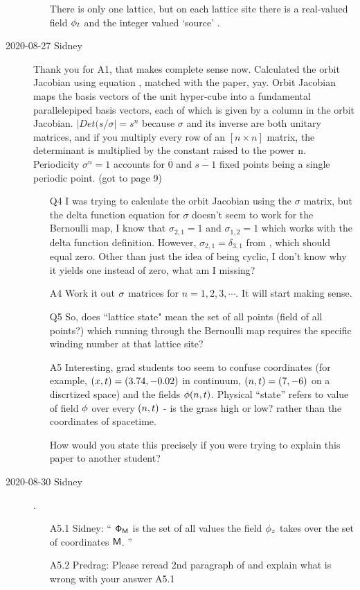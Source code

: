 \begin{description}
\begin{itemize}
There is only one lattice, but on each lattice site there is a
real-valued field $\phi_{t}$ and the integer valued `source' \Ssym{\zeit}.
\end{itemize}

\item[2020-08-27 Sidney]
Thank you for A1, that makes complete sense now. Calculated the orbit Jacobian using equation , matched with the paper, yay. Orbit Jacobian maps the basis vectors of the unit hyper-cube into a fundamental parallelepiped basis vectors, each of which is given by a column in the orbit Jacobian. $|Det(s/\sigma|=s^n$ because $\sigma$ and its inverse are both unitary matrices, and if you multiply every row of an $[n\times{n}]$ matrix, the determinant is multiplied by the constant raised to the power n. Periodicity $\sigma^n=1$ accounts for $\overline{0}$ and $\overline{s-1}$ fixed points being a single periodic point. (got to page 9)

\begin{itemize}
	\item[Q4]
I was trying to calculate the orbit Jacobian using the $\sigma$ matrix, but the delta function equation  for $\sigma$ doesn't seem to work for the Bernoulli map, I know that $\sigma_{2,1}=1$ and $\sigma_{1,2}=1$ which works with the delta function definition. However, $\sigma_{2,1}=\delta_{3,1}$ from , which should equal zero. Other than just the idea of being cyclic, I don't know why it yields one instead of zero, what am I missing?
  \item[A4]
Work it out $\mathbf{\sigma}$ matrices for $n=1,2,3,\cdots$. It will start making sense.
	\item[Q5]
So, does ``lattice state" mean the set of all points (field of all points?) which running through the Bernoulli map requires the specific winding number at that lattice site?
  \item[A5]
Interesting, grad students too seem to confuse coordinates (for example,
$(x,t)=(3.74,-0.02)$ in continuum, $(n,t)=(7,-6)$ on a discrtized space)
and the
fields $\phi(n,t)$. Physical ``state'' refers to value of field $\phi$
over every $(n,t)$ - is the grass high or low? rather than the coordinates
of spacetime.

How would you state this precisely if you were trying to explain this
paper to another student?
\end{itemize}

\item[2020-08-30 Sidney].
\begin{itemize}
  \item[A5.1]
Sidney: ``
$\mathsf{\Phi}_{\mathsf{M}}$ is the set of all values the field $\phi_z$ takes over
the set of coordinates $\mathsf{M}$.
''
  \item[A5.2]
Predrag: Please reread 2nd paragraph of  and explain what
is wrong with your answer A5.1
\end{itemize}


\end{description}
